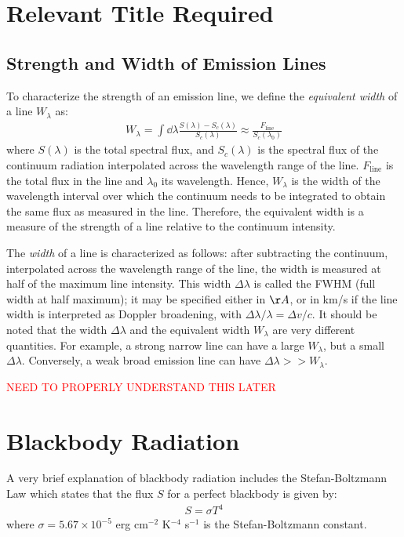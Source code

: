 \documentclass[a4paper,11pt]{report}
\newcommand{\red}[1]{\textcolor{red}{#1}}
\newcommand{\tx}[1]{\text{#1}}
\begin{document}
\section{Relevant Title Required}

\subsection{Strength and Width of Emission Lines}
To characterize the strength of an emission line, we define the \textit{equivalent width} of a line $W_\lambda$ as:
\begin{align*}
  W_\lambda = \int \dd \lambda \frac{S(\lambda) - S_c(\lambda)}{S_c(\lambda)} \approx \frac{F_\tx{line}}{S_c(\lambda_0)}
\end{align*}
where $S(\lambda)$ is the total spectral flux, and $S_c(\lambda)$ is the spectral flux of the continuum radiation interpolated across the wavelength range of the line. $F_\tx{line}$ is the total flux in the line and $\lambda_0$ its wavelength. Hence, $W_\lambda$ is the width of the wavelength interval over which the continuum needs to be integrated to obtain the same flux as measured in the line. Therefore, the equivalent width is a measure of the strength of a line relative to the continuum intensity.

\vspace{1em}

The \textit{width} of a line is characterized as follows: after subtracting the continuum, interpolated across the wavelength range of the line, the width is measured at half of the maximum line intensity. This width $\Delta \lambda$ is called the FWHM (full width at half maximum); it may be specified either in $\AA$, or in km/s if the line width is interpreted as Doppler broadening, with $\Delta \lambda / \lambda = \Delta v/ c$. It should be noted that the width $\Delta \lambda$ and the equivalent width $W_\lambda$ are very different quantities. For example, a strong narrow line can have a large $W_\lambda$, but a small $\Delta \lambda$. Conversely, a weak broad emission line can have $\Delta \lambda >> W_\lambda$.

\red{NEED TO PROPERLY UNDERSTAND THIS LATER}


\section{Blackbody Radiation}
A very brief explanation of blackbody radiation includes the Stefan-Boltzmann Law which states that the flux $S$ for a perfect blackbody is given by:
\begin{align}
  S = \sigma T^4 \label{def:stefan-boltzmann}
\end{align}
where $\sigma = 5.67 \times 10^{-5}$ erg cm$^{-2}$ K$^{-4}$ s$^{-1}$ is the Stefan-Boltzmann constant.
\end{document}
